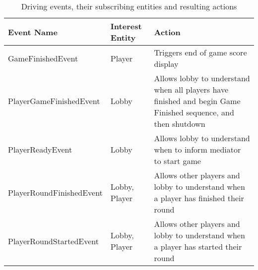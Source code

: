 \begin{table}[H]
	\centering
	\begin{tabular}{ | l | l | p{10cm} | }
		\hline
		Event Name & Interest Entity & Action  \\
		\hline
		\hline
		GameFinishedEvent & Player & Triggers end of game score display\\ 
		\hline
		PlayerGameFinishedEvent & Lobby & Allows lobby to understand when all players have finished and begin Game Finished sequence, and then shutdown \\
		\hline
		PlayerReadyEvent & Lobby & Allows lobby to understand when to inform mediator to start game \\
		\hline
		PlayerRoundFinishedEvent & Lobby, Player & Allows other players and lobby to understand when a player has finished their round \\
		\hline
		PlayerRoundStartedEvent & Lobby, Player & Allows other players and lobby to understand when a player has started their round \\
		\hline
	\end{tabular}
	\caption{Driving events, their subscribing entities and resulting actions}
	\label{tab:eventsEntitiesAndActions}
\end{table}